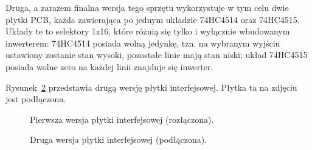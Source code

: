 Druga, a zarazem finalna wersja tego sprzętu wykorzystuje w tym celu dwie płytki PCB, każda zawierająca po jednym układzie 74HC4514 oraz 74HC4515. Układy te to selektory 1\ppauza{}z\ppauza{}16, które różnią się tylko i wyłącznie wbudowanym inwerterem: 74HC4514 posiada wolną jedynkę, tzn. na wybranym wyjściu ustawiony zostanie stan wysoki, pozostałe linie mają stan niski; układ 74HC4515 posiada wolne zero \pauza na każdej linii znajduje się inwerter.

Rysunek~\ref{fig:second_interface} przedstawia drugą wersję płytki interfejsowej. Płytka ta na zdjęciu jest podłączona.\\

\begin{figure}
 \centering
 \caption{Pierwsza wersja płytki interfejsowej (rozłączona).}
 \label{fig:first_interface}
\end{figure}

\begin{figure}
 \centering
 \caption{Druga wersja płytki interfejsowej (podłączona).}
 \label{fig:second_interface}
\end{figure}

